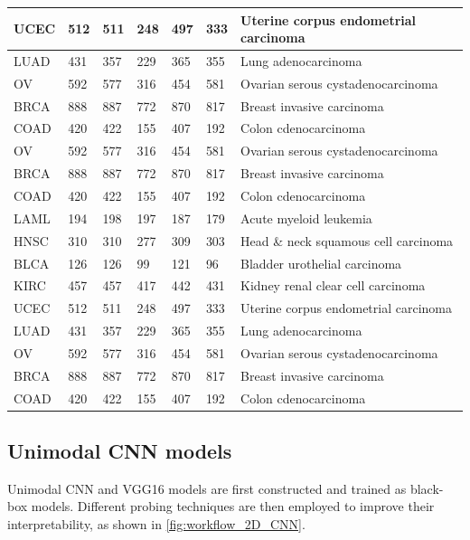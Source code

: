 \begin{table} [h]
\begin{tabular}{l|l|l|l|l|l|l}
            UCEC & 512 & 511 & 248 & 497 & 333 & Uterine corpus endometrial carcinoma \\\hline
            LUAD & 431 & 357 & 229 & 365 & 355 & Lung adenocarcinoma \\\hline
            OV   & 592 & 577 & 316 & 454 & 581 & Ovarian serous cystadenocarcinoma \\\hline
            BRCA & 888 & 887 & 772 & 870 & 817 & Breast invasive carcinoma  \\\hline
            COAD & 420 & 422 & 155 & 407 & 192 & Colon cdenocarcinoma \\\hline
            OV   & 592 & 577 & 316 & 454 & 581 & Ovarian serous cystadenocarcinoma \\\hline
            BRCA & 888 & 887 & 772 & 870 & 817 & Breast invasive carcinoma  \\\hline
            COAD & 420 & 422 & 155 & 407 & 192 & Colon cdenocarcinoma \\\hline
            LAML & 194 & 198 & 197 & 187 & 179 & Acute myeloid leukemia	\\\hline%
            HNSC & 310 & 310 & 277 & 309 & 303 & Head \& neck squamous cell carcinoma \\\hline 
            BLCA & 126 & 126 & 99 & 121 & 96 & Bladder urothelial carcinoma \\\hline 
            KIRC & 457 & 457 & 417 & 442 & 431 & Kidney renal clear cell carcinoma  \\\hline
            UCEC & 512 & 511 & 248 & 497 & 333 & Uterine corpus endometrial carcinoma \\\hline
            LUAD & 431 & 357 & 229 & 365 & 355 & Lung adenocarcinoma \\\hline
            OV   & 592 & 577 & 316 & 454 & 581 & Ovarian serous cystadenocarcinoma \\\hline
            BRCA & 888 & 887 & 772 & 870 & 817 & Breast invasive carcinoma  \\\hline
            COAD & 420 & 422 & 155 & 407 & 192 & Colon cdenocarcinoma \\\hline
    \end{tabular}
    \vspace{-2mm}
\end{table}

\subsection{Unimodal CNN models}
Unimodal CNN and VGG16 models are first constructed and trained as black-box models. Different probing techniques are then employed to improve their interpretability, as shown in  \cref{fig:workflow_2D_CNN}. 

